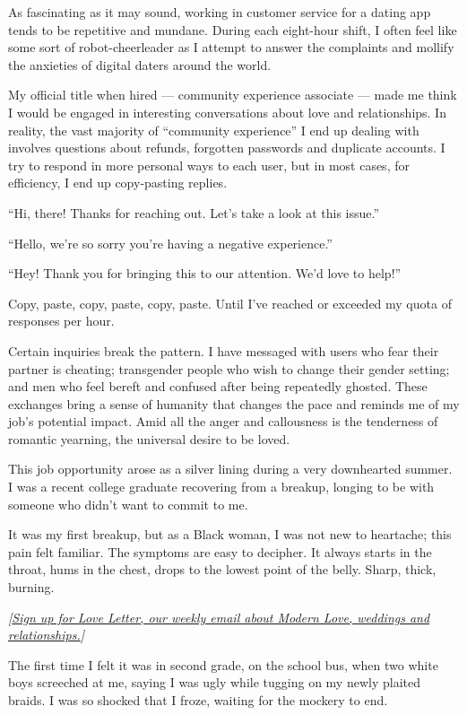 As fascinating as it may sound, working in customer service for a dating
app tends to be repetitive and mundane. During each eight-hour shift, I
often feel like some sort of robot-cheerleader as I attempt to answer
the complaints and mollify the anxieties of digital daters around the
world.

My official title when hired --- community experience associate --- made
me think I would be engaged in interesting conversations about love and
relationships. In reality, the vast majority of ``community experience''
I end up dealing with involves questions about refunds, forgotten
passwords and duplicate accounts. I try to respond in more personal ways
to each user, but in most cases, for efficiency, I end up copy-pasting
replies.

``Hi, there! Thanks for reaching out. Let's take a look at this issue.''

``Hello, we're so sorry you're having a negative experience.''

``Hey! Thank you for bringing this to our attention. We'd love to
help!''

Copy, paste, copy, paste, copy, paste. Until I've reached or exceeded my
quota of responses per hour.

Certain inquiries break the pattern. I have messaged with users who fear
their partner is cheating; transgender people who wish to change their
gender setting; and men who feel bereft and confused after being
repeatedly ghosted. These exchanges bring a sense of humanity that
changes the pace and reminds me of my job's potential impact. Amid all
the anger and callousness is the tenderness of romantic yearning, the
universal desire to be loved.

This job opportunity arose as a silver lining during a very downhearted
summer. I was a recent college graduate recovering from a breakup,
longing to be with someone who didn't want to commit to me.

It was my first breakup, but as a Black woman, I was not new to
heartache; this pain felt familiar. The symptoms are easy to decipher.
It always starts in the throat, hums in the chest, drops to the lowest
point of the belly. Sharp, thick, burning.

\emph{{[}}\href{https://www.nytimes3xbfgragh.onion/newsletters/love-letter}{\emph{Sign
up for Love Letter, our weekly email about Modern Love, weddings and
relationships.}}\emph{{]}}

The first time I felt it was in second grade, on the school bus, when
two white boys screeched at me, saying I was ugly while tugging on my
newly plaited braids. I was so shocked that I froze, waiting for the
mockery to end.

